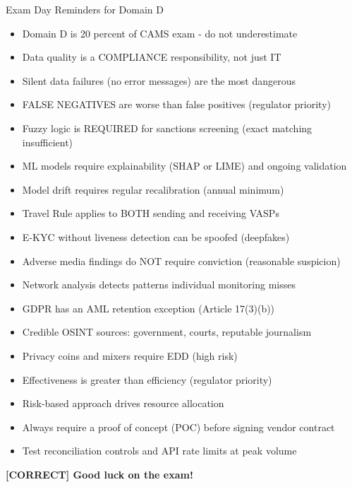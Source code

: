 \documentclass[11pt,a4paper]{beamer}
\newcommand{\greennote}[1]{\textcolor{green!50!black}{\textbf{[CORRECT] #1}}}
\begin{document}
	\begin{frame}{Exam Day Reminders for Domain D}
		\begin{itemize}
			\item Domain D is 20 percent of CAMS exam - do not underestimate
			\item Data quality is a COMPLIANCE responsibility, not just IT
			\item Silent data failures (no error messages) are the most dangerous
			\item FALSE NEGATIVES are worse than false positives (regulator priority)
			\item Fuzzy logic is REQUIRED for sanctions screening (exact matching insufficient)
			\item ML models require explainability (SHAP or LIME) and ongoing validation
			\item Model drift requires regular recalibration (annual minimum)
			\item Travel Rule applies to BOTH sending and receiving VASPs
			\item E-KYC without liveness detection can be spoofed (deepfakes)
			\item Adverse media findings do NOT require conviction (reasonable suspicion)
			\item Network analysis detects patterns individual monitoring misses
			\item GDPR has an AML retention exception (Article 17(3)(b))
			\item Credible OSINT sources: government, courts, reputable journalism
			\item Privacy coins and mixers require EDD (high risk)
			\item Effectiveness is greater than efficiency (regulator priority)
			\item Risk-based approach drives resource allocation
			\item Always require a proof of concept (POC) before signing vendor contract
			\item Test reconciliation controls and API rate limits at peak volume
		\end{itemize}
		\vspace{0.3cm}
		\centering
		\greennote{Good luck on the exam!}
	\end{frame}
	
	
	
	
\end{document}
